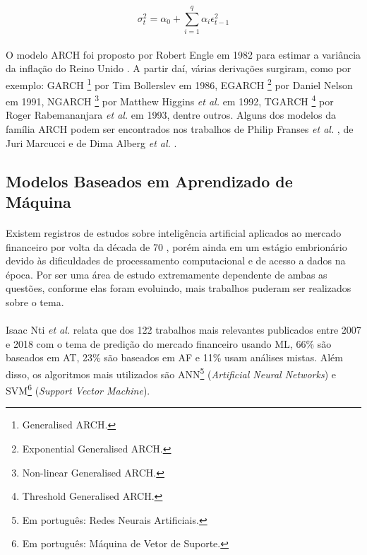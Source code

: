 \begin{equation} \label{eq:4}
\sigma_t^2 = \alpha_0 + \sum_{i=1}^{q} \alpha_i\epsilon_{t-1}^{2}
\end{equation}

\paragraph{} O modelo ARCH foi proposto por Robert Engle em 1982 para estimar a variância da inflação do Reino Unido \cite{engle1982autoregressive}. A partir daí, várias derivações surgiram, como por exemplo: GARCH \footnote{Generalised ARCH.} por Tim Bollerslev \cite{bollerslev1986generalized} em 1986, EGARCH \footnote{Exponential Generalised ARCH.} por Daniel Nelson \cite{nelson1991conditional} em 1991, NGARCH \footnote{Non-linear Generalised ARCH.} por Matthew Higgins \textit{et al.} \cite{higgins1992class} em 1992, TGARCH \footnote{Threshold Generalised ARCH.} por Roger Rabemananjara \textit{et al.} \cite{rabemananjara1993threshold} em 1993, dentre outros. Alguns dos modelos da família ARCH podem ser encontrados nos trabalhos de Philip Franses \textit{et al.} \cite{franses1996forecasting}, de Juri Marcucci \cite{marcucci2005forecasting} e de Dima Alberg \textit{et al.} \cite{alberg2008estimating}.



\FloatBarrier
\subsection{Modelos Baseados em Aprendizado de Máquina}
\label{sub:ml_models_study}

\paragraph{} Existem registros de estudos sobre inteligência artificial aplicados ao mercado financeiro por volta da década de 70 \cite{felsen1975artificial}, porém ainda em um estágio embrionário devido às dificuldades de processamento computacional e de acesso a dados na época. Por ser uma área de estudo extremamente dependente de ambas as questões, conforme elas foram evoluindo, mais trabalhos puderam ser realizados sobre o tema.

\paragraph{} Isaac Nti \textit{et al.} \cite{nti2020systematic} relata que dos 122 trabalhos mais relevantes publicados entre 2007 e 2018 com o tema de predição do mercado financeiro usando ML, 66\% são baseados em AT, 23\% são baseados em AF e 11\% usam análises mistas. Além disso, os algoritmos mais utilizados são ANN\footnote{Em português: Redes Neurais Artificiais.} (\textit{Artificial Neural Networks}) e SVM\footnote{Em português: Máquina de Vetor de Suporte.} (\textit{Support Vector Machine}).

